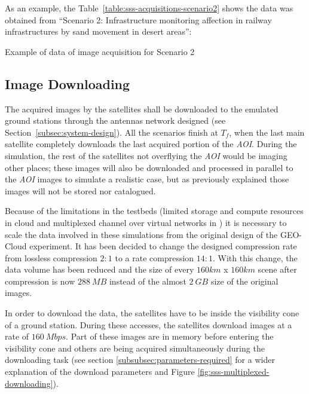 As an example, the Table~\ref{table:sss-acquisitions-scenario2} shows the data was obtained from ``Scenario 2: Infrastructure monitoring affection in railway infrastructures by sand movement in desert areas'':

\begin{table}[h]
  \centering
  {\small
  
  }
  \caption{Example of data of image acquisition for Scenario 2}
  \label{table:sss-acquisitions-scenario2}
\end{table}


\subsection{Image Downloading}
\label{subsec:image-downloading}

The acquired images by the satellites shall be downloaded to the emulated ground
stations through the antennas network designed (see Section~\ref{subsec:system-design}). All the scenarios finish at $T_f$, when the last
main satellite completely downloads the last acquired portion of the
\emph{AOI}. During the simulation, the rest of the satellites not overflying the
\emph{AOI} would be imaging other places; these images will also be downloaded
and processed in parallel to the \emph{AOI} images to simulate a realistic case,
but as previously explained those images will not be stored nor catalogued.

Because of the limitations in the testbeds (limited storage and compute
resources in \bonfire cloud and multiplexed channel over virtual networks in
\vw) it is necessary to scale the data involved in these simulations from the
original design of the GEO-Cloud experiment. It has been decided to change the
designed compression rate from lossless compression $2:1$ to a rate compression
$14:1$. With this change, the data volume has been reduced and the size of every
$160km$ x $160km$ scene after compression is now $288~MB$ instead of the almost
$2~GB$ size of the original images.

In order to download the data, the satellites have to be inside the visibility
cone of a ground station. During these accesses, the satellites download images
at a rate of $160~Mbps$. Part of these images are in memory before entering the
visibility cone and others are being acquired simultaneously during the
downloading task (see section \ref{subsubsec:parameters-required} for a wider explanation of the download parameters and Figure \ref{fig:sss-multiplexed-downloading}).

